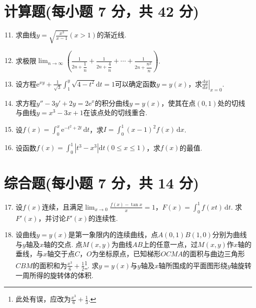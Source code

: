 \documentclass[../main.tex]{subfiles}
\begin{document}
\section{计算题(每小题 7 分，共 42 分)}
\begin{enumerate}
    \setcounter{enumi}{10}
    \item 求曲线$y=\sqrt{\frac{x^{3}}{x-1}}(x>1)$的渐近线.
          \vspace{10em}

    \item 求极限$\lim_{n\to\infty}\left(\frac{1}{2n+\dfrac{1}{n}}+\frac{1}{2n+\dfrac{4}{n}}
              +\cdots+\frac{1}{2n+\dfrac{n^2}{n}}\right)$.
          \vspace{10em}

    \item 设方程$\mathrm{e}^{xy}+\frac{1}{\sqrt{3}}\int_{1}^{y}\sqrt{4-t^{2}}
              \mathrm{d}t=1$可以确定函数$y=y(x)$，求$\left.\frac{\mathrm{d}y}{dx}\right|_{x=0}$.
          \vspace{10em}

    \item 求方程$y''-3y'+2y=2\mathrm{e}^{x}$的积分曲线$y=y(x)$，使其在点$(0,
              1)$处的切线与曲线$y=x^{3}-3x+1$在该点处的切线重合.
          \vspace{12em}

    \item 设$f(x)=\int_{0}^{x}\mathrm{e}^{-t^2+2t}\,\mathrm{d}t$，求$I=\int_{0}
              ^{1}(x-1)^{2} f(x)\,\mathrm{d}x$.
          \vspace{12em}

    \item 设函数$f(x)=\int_{0}^{1}|t^{3}-x^{3}|\mathrm{d}t(0\leq x\leq 1)$，求$f
              (x)$的最值.
          \vspace{12em}
\end{enumerate}

\section{综合题(每小题 7 分，共 14 分)}
\begin{enumerate}
    \setcounter{enumi}{16}
    \item 设$f(x)$连续，且满足$\lim_{x\to 0}\frac{f(x)-\tan x}{x}=1$，$F(x)=
              \int_{0}^{1}f(xt)\,\mathrm{d}t$. 求$F'(x)$，并讨论$F'(x)$的连续性.
          \vspace{12em}

    \item 设曲线$y=y(x)$是第一象限内的连续曲线，点$A(0,1)B(1,0)$分别为曲线与$y$轴及$x$轴的交点.
          点$M(x,y)$为曲线$AB$上的任意一点，过$M(x,y)$作$x$轴的垂线，与$x$轴交于点$C$，$O$为坐标原点，已知梯形$O
              CMA$的面积与曲边三角形$CBM$的面积和为$\frac{x^{3}}{6}+\frac{1}{2}$\footnote{此处有误，应改为$\frac{x^{3}}{6}
                  +\frac{1}{3}$.}. 求$y=y(x)$与$y$轴及$x$轴所围成的平面图形绕$y$轴旋转一周所得的旋转体的体积.
          \vspace{13em}
\end{enumerate}
\end{document}
